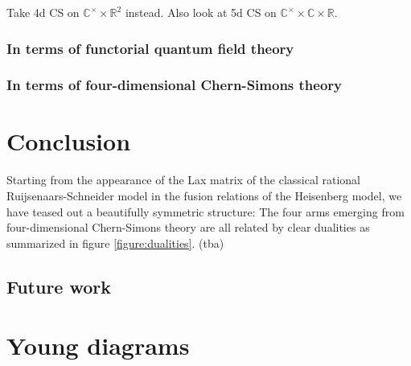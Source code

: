 \documentclass[11pt]{report}
\theoremstyle{definition}
\theoremstyle{remark}
\theoremstyle{remark}
\newcommand{\R}{\mathbb{R}}
\newcommand{\C}{\mathbb{C}}
\begin{document}
Take 4d CS on $\C^\times \times \R^2$ instead. Also look at 5d CS on $\C^\times \times \C \times \R$.

\subsection{In terms of functorial quantum field theory}

\subsection{In terms of four-dimensional Chern-Simons theory}

\chapter{Conclusion}\label{chapter:conclusion}

Starting from the appearance of the Lax matrix of the classical rational Ruijsenaars-Schneider model in the fusion relations of the Heisenberg model, we have teased out a beautifully symmetric structure: The four arms emerging from four-dimensional Chern-Simons theory are all related by clear dualities as summarized in figure \ref{figure:dualities}. (tba)

\section*{Future work}



\appendix \label{appendix}

\chapter{Young diagrams} \label{appendix:youngdiagrams}
\end{document}
